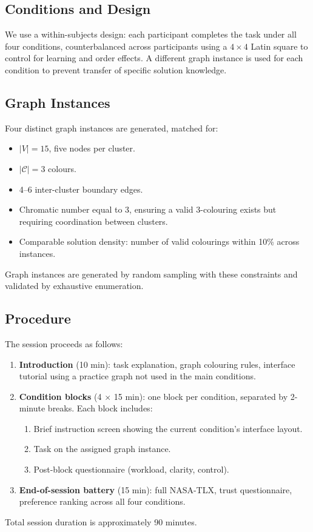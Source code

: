 \documentclass[10pt]{article}
\theoremstyle{definition}
\begin{document}
\subsection{Conditions and Design}

We use a within-subjects design: each participant completes the task under all four conditions,
counterbalanced across participants using a $4 \times 4$ Latin square to control for learning and
order effects.  A different graph instance is used for each condition to prevent transfer of
specific solution knowledge.

\subsection{Graph Instances}

Four distinct graph instances are generated, matched for:
\begin{itemize}
  \item $|V| = 15$, five nodes per cluster.
  \item $|\mathcal{C}| = 3$ colours.
  \item 4--6 inter-cluster boundary edges.
  \item Chromatic number equal to 3, ensuring a valid 3-colouring exists but requiring
        coordination between clusters.
  \item Comparable solution density: number of valid colourings within 10\% across instances.
\end{itemize}
Graph instances are generated by random sampling with these constraints and validated by
exhaustive enumeration.

\subsection{Procedure}

The session proceeds as follows:
\begin{enumerate}
  \item \textbf{Introduction} (10 min): task explanation, graph colouring rules, interface tutorial
        using a practice graph not used in the main conditions.
  \item \textbf{Condition blocks} (4 $\times$ 15 min): one block per condition, separated by
        2-minute breaks.  Each block includes:
        \begin{enumerate}[label=\alph*.]
          \item Brief instruction screen showing the current condition's interface layout.
          \item Task on the assigned graph instance.
          \item Post-block questionnaire (workload, clarity, control).
        \end{enumerate}
  \item \textbf{End-of-session battery} (15 min): full NASA-TLX, trust questionnaire, preference
        ranking across all four conditions.
\end{enumerate}
Total session duration is approximately 90 minutes.
\end{document}

